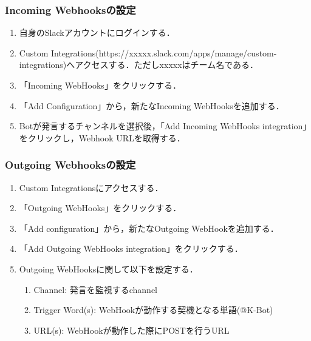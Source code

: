 \documentclass[fleqn, 14pt]{sty/extarticlej}
\begin{document}
\subsubsection{Incoming Webhooksの設定}
\begin{enumerate}
\item 自身のSlackアカウントにログインする．
\item Custom Integrations(https://xxxxx.slack.com/apps/manage/custom-integrations)へアクセスする．ただしxxxxxはチーム名である．
\item 「Incoming WebHooks」をクリックする．
\item 「Add Configuration」から，新たなIncoming WebHooksを追加する．
\item Botが発言するチャンネルを選択後，「Add Incoming WebHooks integration」をクリックし，Webhook URLを取得する．

\end{enumerate}

\subsubsection{Outgoing Webhooksの設定}
\begin{enumerate}
\item Custom Integrationsにアクセスする．
\item 「Outgoing WebHooks」をクリックする．
\item 「Add configuration」から，新たなOutgoing WebHookを追加する．
\item 「Add Outgoing WebHooks integration」をクリックする．
\item Outgoing WebHooksに関して以下を設定する．
  \begin{enumerate}
  \item Channel: 発言を監視するchannel
  \item Trigger Word(s): WebHookが動作する契機となる単語(@K-Bot)
  \item URL(s): WebHookが動作した際にPOSTを行うURL
  \end{enumerate}
\end{enumerate}
\end{document}
